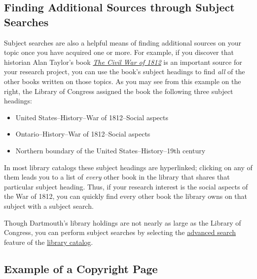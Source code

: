 \subsection{Finding Additional Sources through Subject Searches} Subject
searches are also a helpful means of finding additional sources on your  topic
once you have acquired one or more. For example, if you discover that  historian
Alan Taylor's book \emph{\href{http://libcat.dartmouth.edu/record=b4878766}{The
Civil War of 1812}} is an important  source for your research project, you can
use the book's subject headings to  find \emph{all} of the other books written
on those topics. As you may see from this example on the right, the
Library of Congress  assigned the book the following three subject headings:

\begin{itemize}
\item{\small United States--History--War of 1812--Social aspects}

\item{\small Ontario--History--War of 1812--Social aspects}

\item{\small Northern boundary of the United States--History--19th century}
\end{itemize}

\noindent In most library catalogs these subject headings are hyperlinked;
clicking on  any of them leads you to a list of \emph{every} other book in the
library that shares  that particular subject heading. Thus, if your research
interest is the social aspects of the War of 1812, you can quickly find every
other book the library owns on that subject with a subject search.

Though Dartmouth's library holdings are not nearly as large as the Library of
Congress, you  can perform subject searches by selecting the \href{https://search.library.dartmouth.edu/discovery/search?vid=01DCL_INST:01DCL&mode=advanced}{advanced search} feature of the
\href{https://search.library.dartmouth.edu/}{library catalog}.

\subsection{Example of a Copyright Page}

\medskip

